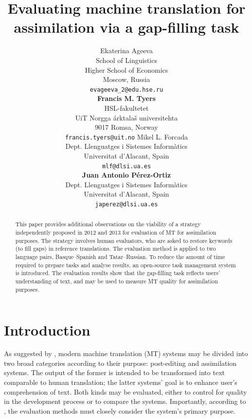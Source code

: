 \documentclass[11pt]{article}
\title{Evaluating machine translation for assimilation via a gap-filling task}
\author{Ekaterina Ageeva\\
  School of Linguistics\\
  Higher School of Economics\\
  Moscow, Russia\\
  {\tt evageeva\_2@edu.hse.ru}\\[2ex]
  \textbf{Francis M. Tyers}\\
  HSL-fakultetet\\ 
  UiT Norgga \'{a}rktala\v{s} universitehta \\
  9017 Romsa, Norway \\
  {\tt francis.tyers@uit.no}
  \And
  Mikel L. Forcada\\
  Dept. Llenguatges i Sistemes Inform\`{a}tics\\
  Universitat d'Alacant, Spain \\
  {\tt mlf@dlsi.ua.es}  \\[2ex]
  \textbf{Juan Antonio P\'{e}rez-Ortiz} \\
  Dept. Llenguatges i Sistemes Inform\`{a}tics\\
  Universitat d'Alacant, Spain \\
  {\tt japerez@dlsi.ua.es}
}
\date{}
\begin{document}
\maketitle
\renewcommand{\baselinestretch}{0.96} %
\begin{abstract}
  This paper provides additional observations on the viability of a
  strategy independently proposed in 2012 and 2013 for evaluation of
 MT for assimilation purposes. The strategy involves
  human evaluators, who are asked to restore keywords (to fill gaps) in
  reference translations. The evaluation method is applied to two language pairs, Basque--Spanish and Tatar--Russian. To reduce the amount of time required to prepare tasks
  and analyse results, an open-source task management system is
  introduced. The evaluation results show that the gap-filling task
  reflects users' understanding of text, and may be used to measure MT
  quality for assimilation purposes.
\end{abstract}

\section{Introduction}

As suggested by \citet{church93}, modern machine translation (MT) systems may
be divided into two broad categories according to their purpose: post-editing and assimilation systems. The output of the former is intended to be transformed into text comparable to human translation; the latter systems' goal is to enhance user's comprehension of text. Both kinds may be evaluated, either to control for quality in the development process or to compare the systems. Importantly, according to \citet{church93}, the evaluation methods must closely consider the system's primary purpose.
\end{document}
